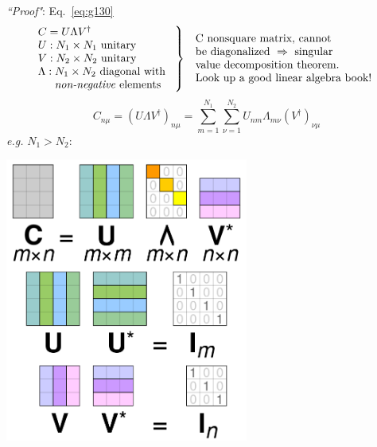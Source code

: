 \documentclass[12pt]{article}
\begin{document}

\emph{``Proof"}: Eq.~\eqref{eq:g130}
\[
\left.
\begin{array}{l}
C=U \Lambda V^{\dagger} \\ 
U: N_{1} \times N_{1} \text { unitary } \\ 
V: N_{2} \times N_{2} \text { unitary } \\
\Lambda: N_{1} \times N_{2} \text { diagonal with }\\
\quad\,\,\,\text{\emph{non-negative} elements}
\end{array}
\right\}
\begin{array}{l}
\text { C nonsquare matrix, cannot } \\ 
\text { be diagonalized } \Rightarrow \text { singular } \\ 
\text { value decomposition theorem. } \\
\text { Look up a good linear algebra book! }
\end{array}
\]
\[
C_{n \mu}=\left(U \Lambda V^{\dagger}\right)_{n \mu}=\sum_{m=1}^{N_{1}} \sum_{\nu=1}^{N_{2}} U_{n m} \Lambda_{m \nu}\left(V^{\dagger}\right)_{\nu \mu}
\]
\textit{e.g.} $N_1 > N_2$:


\begin{center}
\includegraphics[width=0.6\textwidth]{Figures/SVD.png}
\end{center}
\end{document}
